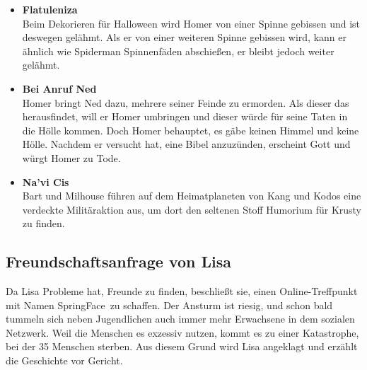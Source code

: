 \begin{itemize}
	\item \textbf{Flatuleniza}\\ Beim Dekorieren für Halloween wird Homer von einer Spinne gebissen und ist deswegen gelähmt. Als er von einer weiteren Spinne gebissen wird, kann er ähnlich wie Spiderman Spinnenfäden abschießen, er bleibt jedoch weiter gelähmt. 
	\item \textbf{Bei Anruf Ned}\\ Homer bringt Ned dazu, mehrere seiner Feinde zu ermorden. Als dieser das herausfindet, will er Homer umbringen und dieser würde für seine Taten in die Hölle kommen. Doch Homer behauptet, es gäbe keinen Himmel und keine Hölle. Nachdem er versucht hat, eine Bibel anzuzünden, erscheint Gott und würgt Homer zu Tode. 
	\item \textbf{Na'vi Cis}\\ Bart und Milhouse führen auf dem Heimatplaneten von Kang und Kodos eine verdeckte Militäraktion aus, um dort den seltenen Stoff Humorium für Krusty zu finden.
\end{itemize}


\subsection{Freundschaftsanfrage von Lisa}\label{PABF04}
Da Lisa Probleme hat, Freunde zu finden, beschließt sie, einen Online-Treffpunkt mit Namen \glqq SpringFace\grqq\ zu schaffen. Der Ansturm ist riesig, und schon bald tummeln sich neben Jugendlichen auch immer mehr Erwachsene in dem sozialen Netzwerk. Weil die Menschen es exzessiv nutzen, kommt es zu einer Katastrophe, bei der 35 Menschen sterben. Aus diesem Grund wird Lisa angeklagt und erzählt die Geschichte vor Gericht.


